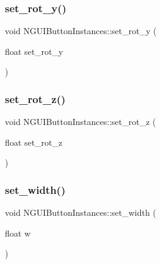 \hypertarget{class_n_g_u_i_button_instances_a67548a155d6278052664aa2a21de1263}{}\label{class_n_g_u_i_button_instances_a67548a155d6278052664aa2a21de1263} 
\subsubsection{\texorpdfstring{set\+\_\+rot\+\_\+y()}{set\_rot\_y()}}
{\footnotesize\ttfamily void N\+G\+U\+I\+Button\+Instances\+::set\+\_\+rot\+\_\+y (\begin{DoxyParamCaption}\item[{float}]{set\+\_\+rot\+\_\+y }\end{DoxyParamCaption})}

\hypertarget{class_n_g_u_i_button_instances_ad0625b6f5330e91af1773288a868e99b}{}\label{class_n_g_u_i_button_instances_ad0625b6f5330e91af1773288a868e99b} 
\subsubsection{\texorpdfstring{set\+\_\+rot\+\_\+z()}{set\_rot\_z()}}
{\footnotesize\ttfamily void N\+G\+U\+I\+Button\+Instances\+::set\+\_\+rot\+\_\+z (\begin{DoxyParamCaption}\item[{float}]{set\+\_\+rot\+\_\+z }\end{DoxyParamCaption})}

\hypertarget{class_n_g_u_i_button_instances_a6c30f3b2e6c2dec54f900ce3dce876b3}{}\label{class_n_g_u_i_button_instances_a6c30f3b2e6c2dec54f900ce3dce876b3} 
\subsubsection{\texorpdfstring{set\+\_\+width()}{set\_width()}}
{\footnotesize\ttfamily void N\+G\+U\+I\+Button\+Instances\+::set\+\_\+width (\begin{DoxyParamCaption}\item[{float}]{w }\end{DoxyParamCaption})}

